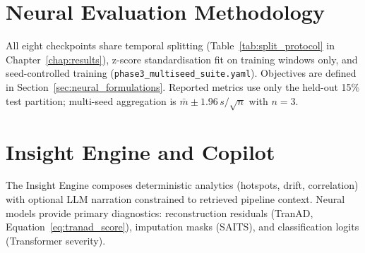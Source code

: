 \section{Neural Evaluation Methodology}

All eight checkpoints share temporal splitting (Table~\ref{tab:split_protocol} in Chapter~\ref{chap:results}), z-score standardisation fit on training windows only, and seed-controlled training (\texttt{phase3\_multiseed\_suite.yaml}). Objectives are defined in Section~\ref{sec:neural_formulations}. Reported metrics use only the held-out 15\% test partition; multi-seed aggregation is $\bar{m} \pm 1.96\,s/\sqrt{n}$ with $n=3$.

\section{Insight Engine and Copilot}

The Insight Engine composes deterministic analytics (hotspots, drift, correlation) with optional LLM narration constrained to retrieved pipeline context. Neural models provide primary diagnostics: reconstruction residuals (TranAD, Equation~\ref{eq:tranad_score}), imputation masks (SAITS), and classification logits (Transformer severity).
